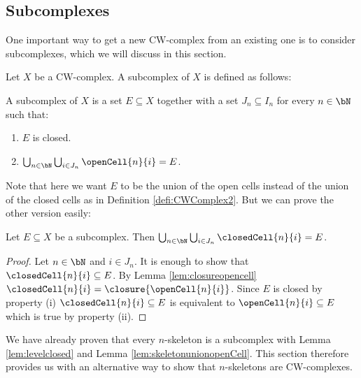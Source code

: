 \subsection{Subcomplexes}\label{sec:mathsubcomplex}

One important way to get a new CW-complex from an existing one is to consider subcomplexes, which we will discuss in this section. 

Let $X$ be a CW-complex. A subcomplex of $X$ is defined as follows:

\begin{defi} \label{defi:subcomplex}
    A subcomplex of $X$ is a set $E \subseteq X$ together with a set $J_n \subseteq I_n$ for every $n \in \bN$ such that:
    \href{https://github.com/scholzhannah/CWComplexes/blob/7be4872a05b534011cc969eb5b80a4b7f0bf57e2/CWcomplexes/subcomplex.lean#L44-L52}{\faExternalLink}
    \begin{enumerate}
        \item $E$ is closed.
        \item $\bigcup_{n \in \bN} \bigcup_{i \in J_n} \openCell{n}{i} = E$.
    \end{enumerate}
\end{defi}

Note that here we want $E$ to be the union of the open cells instead of the union of the closed cells as in Definition \ref{defi:CWComplex2}. 
But we can prove the other version easily: 

\begin{lem} \label{lem:subcomplexunionclosed}
    Let $E \subseteq X$ be a subcomplex. 
    Then $\bigcup_{n \in \bN} \bigcup_{i \in J_n} \closedCell{n}{i} = E$.
    \href{https://github.com/scholzhannah/CWComplexes/blob/7be4872a05b534011cc969eb5b80a4b7f0bf57e2/CWcomplexes/subcomplex.lean#L98-L108}{\faExternalLink}
\end{lem}
\begin{proof}
    Let $n \in \bN$ and $i \in J_n$. 
    It is enough to show that $\closedCell{n}{i} \subseteq E$. 
    By Lemma \ref{lem:closureopencell} $\closedCell{n}{i} = \closure{\openCell{n}{i}}$. 
    Since $E$ is closed by property (i) $\closedCell{n}{i} \subseteq E$ is equivalent to $\openCell{n}{i} \subseteq E$ which is true by property (ii).
\end{proof}

\begin{example}
    We have already proven that every $n$-skeleton is a subcomplex with Lemma \ref{lem:levelclosed} and Lemma \ref{lem:skeletonunionopenCell}. 
    \href{https://github.com/scholzhannah/CWComplexes/blob/7be4872a05b534011cc969eb5b80a4b7f0bf57e2/CWcomplexes/subcomplex.lean#L410-L411}{\faExternalLink}
    This section therefore provides us with an alternative way to show that $n$-skeletons are CW-complexes.
\end{example}

